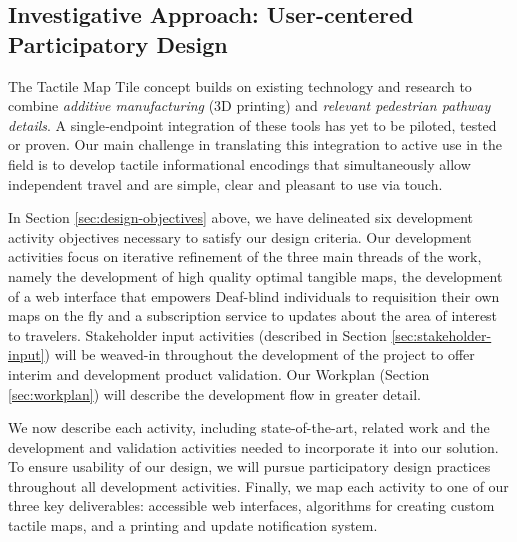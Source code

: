 
\subsection{Investigative Approach: User-centered Participatory Design}

\label{sec:approach}


The Tactile Map Tile concept builds on existing technology and research to combine \textit{additive manufacturing} (3D printing) and \textit{relevant pedestrian pathway details}. A single‐endpoint integration of these tools has yet to be piloted, tested or proven.  Our main challenge in translating this integration to active use in the field is to develop tactile informational encodings that simultaneously allow independent travel and are simple, clear  and pleasant to use via touch. 


In Section \ref{sec:design-objectives} above, we have delineated six development activity objectives necessary to satisfy our design criteria. Our development activities focus on iterative refinement of the
three main threads of the work, namely the development of high quality
optimal tangible maps, the development of a web interface that
empowers Deaf-blind individuals to requisition their own maps on the
fly and a subscription service to updates about the area of interest to travelers. Stakeholder input activities (described in Section \ref{sec:stakeholder-input}) will be weaved-in throughout the development of the project to offer interim and development product validation. Our Workplan (Section \ref{sec:workplan}) will describe the development flow in greater detail. 

We now describe each activity, including state-of-the-art, related work and the development and validation activities needed to incorporate it into our solution. To ensure usability of our design, we will pursue participatory design practices throughout all development activities. 
Finally, we map each activity to one of our three key deliverables: accessible web interfaces, algorithms for creating custom tactile maps, and a printing and update notification system.




